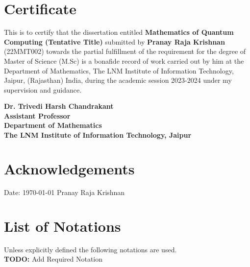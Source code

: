 \documentclass[12pt,twoside]{report}
\theoremstyle{thmstyle}
\begin{document}
\renewcommand{\sectionmark}[1]{\markright{#1}}

\chapter*{Certificate}

This is to certify that the dissertation entitled \textbf{Mathematics of Quantum Computing (Tentative Title)} submitted by \textbf{Pranay Raja Krishnan} (22MMT002) towards the partial fulfillment of the requirement for the degree of Master of Science (M.Sc) is a bonafide record of work carried out by him at the Department of Mathematics, The LNM Institute of Information Technology, Jaipur, (Rajasthan) India, during the academic session 2023-2024 under my supervision and guidance. \\
\vspace*{3cm}
\begin{flushright}
	\hfill
	{\parbox{7cm}{\textbf{Dr. Trivedi Harsh Chandrakant\\
	Assistant Professor\\
	Department of Mathematics\\
	The LNM Institute of Information Technology, Jaipur}}}
\end{flushright}

\chapter*{Acknowledgements}

\lipsum[2]


\vspace*{3cm}
Date: \today
\hfill{}
Pranay Raja Krishnan

\chapter*{List of Notations}
Unless explicitly defined the following notations are used.\\
\textbf{TODO:} Add Required Notation \\
\end{document}
